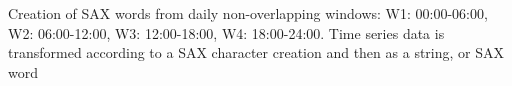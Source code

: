 Creation of SAX words from daily non-overlapping windows: W1: 00:00-06:00, W2: 06:00-12:00, W3: 12:00-18:00, W4: 18:00-24:00. Time series data is transformed according to a SAX character creation and then as a string, or SAX word \cite{miller_automated_2015}
\label{fig:saxcreation}
